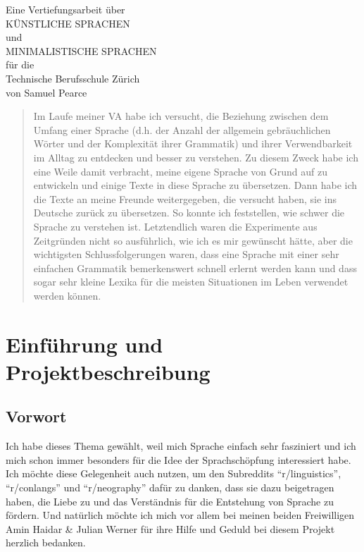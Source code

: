 \documentclass{article}
\begin{document}
\graphicspath{ {../images/} }

\begingroup
\centering
\vfill
\Large{Eine Vertiefungsarbeit über}\\
\Huge{KÜNSTLICHE SPRACHEN}\\
\huge{und}\\
\huge{MINIMALISTISCHE SPRACHEN}\\
\large{für die}\\
\Large{Technische Berufsschule Zürich}\\
\vspace{3cm}
\Large{von Samuel Pearce}\\
\vfill\null
\endgroup
\thispagestyle{empty}

\begin{abstract}
    Im Laufe meiner VA habe ich versucht, die Beziehung zwischen dem Umfang einer Sprache
    (d.h. der Anzahl der allgemein gebräuchlichen Wörter und der Komplexität ihrer Grammatik)
    und ihrer Verwendbarkeit im Alltag zu entdecken und besser zu verstehen.
    Zu diesem Zweck habe ich eine Weile damit verbracht, meine eigene Sprache von Grund auf zu
    entwickeln und einige Texte in diese Sprache zu übersetzen. Dann habe ich die Texte an meine
    Freunde weitergegeben, die versucht haben, sie ins Deutsche zurück zu übersetzen.
    So konnte ich feststellen, wie schwer die Sprache zu verstehen ist.
    Letztendlich waren die Experimente aus Zeitgründen nicht so ausführlich,
    wie ich es mir gewünscht hätte, aber die wichtigsten Schlussfolgerungen waren,
    dass eine Sprache mit einer sehr einfachen Grammatik bemerkenswert schnell erlernt
    werden kann und dass sogar sehr kleine Lexika für die meisten Situationen im Leben verwendet werden können.
\end{abstract}
\pagebreak

\tableofcontents
\pagebreak



\section{Einführung und Projektbeschreibung}
\subsection{Vorwort}
Ich habe dieses Thema gewählt, weil mich Sprache einfach sehr fasziniert und ich mich schon immer besonders
für die Idee der Sprachschöpfung interessiert habe. Ich möchte diese Gelegenheit auch nutzen,
um den Subreddits ``r/linguistics'', ``r/conlangs'' und ``r/neography'' dafür zu danken, dass sie dazu beigetragen haben,
die Liebe zu und das Verständnis für die Entstehung von Sprache zu fördern.
Und natürlich möchte ich mich vor allem bei meinen beiden Freiwilligen Amin Haidar \& Julian Werner
für ihre Hilfe und Geduld bei diesem Projekt herzlich bedanken.
\end{document}
